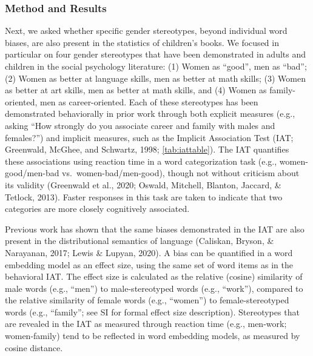 \documentclass[
  english,
  ,man,floatsintext]{apa6}
\begin{document}
\hypertarget{method-and-results-2}{%
\subsubsection{Method and Results}\label{method-and-results-2}}

Next, we asked whether specific gender stereotypes, beyond individual word biases, are also present in the statistics of children's books. We focused in particular on four gender stereotypes that have been demonstrated in adults and children in the social psychology literature: (1) Women as \enquote{good}, men as \enquote{bad}; (2) Women as better at language skills, men as better at math skills; (3) Women as better at art skills, men as better at math skills, and (4) Women as family-oriented, men as career-oriented. Each of these stereotypes has been demonstrated behaviorally in prior work through both explicit measures (e.g., asking \enquote{How strongly do you associate career and family with males and females?}) and implicit measures, such as the Implicit Association Test (IAT; Greenwald, McGhee, and Schwartz, 1998; \autoref{tab:iattable}). The IAT quantifies these associations using reaction time in a word categorization task (e.g., women-good/men-bad vs.~women-bad/men-good), though not without criticism about its validity (Greenwald et al., 2020; Oswald, Mitchell, Blanton, Jaccard, \& Tetlock, 2013). Faster responses in this task are taken to indicate that two categories are more closely cognitively associated.

Previous work has shown that the same biases demonstrated in the IAT are also present in the distributional semantics of language (Caliskan, Bryson, \& Narayanan, 2017; Lewis \& Lupyan, 2020). A bias can be quantified in a word embedding model as an effect size, using the same set of word items as in the behavioral IAT. The effect size is calculated as the relative (cosine) similarity of male words (e.g., \enquote{men}) to male-stereotyped words (e.g., \enquote{work}), compared to the relative similarity of female words (e.g., \enquote{women}) to female-stereotyped words (e.g., \enquote{family}; see SI for formal effect size description). Stereotypes that are revealed in the IAT as measured through reaction time (e.g., men-work; women-family) tend to be reflected in word embedding models, as measured by cosine distance.

\begingroup\fontsize{9}{11}\selectfont
\end{document}
